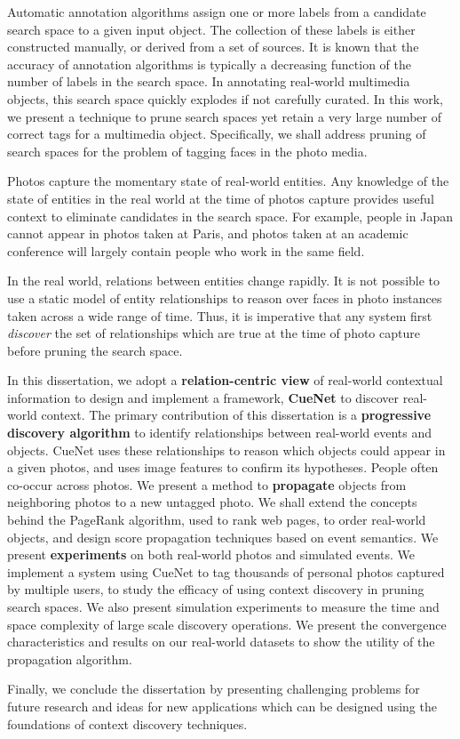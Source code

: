 \thesisabstract
{
Automatic annotation algorithms assign one or more labels from a candidate search space to a given input object. The collection of these labels is either constructed manually, or derived from a set of sources. It is known that the accuracy of annotation algorithms is typically a decreasing function of the number of labels in the search space. In annotating real-world multimedia objects, this search space quickly explodes if not carefully curated. In this work, we present a technique to prune search spaces yet retain a very large number of correct tags for a multimedia object. Specifically, we shall address pruning of search spaces for the problem of tagging faces in the photo media.

Photos capture the momentary state of real-world entities. Any knowledge of the state of entities in the real world at the time of photos capture provides useful context to eliminate candidates in the search space. For example, people in Japan cannot appear in photos taken at Paris, and photos taken at an academic conference will largely contain people who work in the same field. 

In the real world, relations between entities change rapidly. It is not possible to use a static model of entity relationships to reason over faces in photo instances taken across a wide range of time. Thus, it is imperative that any system first \textit{discover} the set of relationships which are true at the time of photo capture before pruning the search space.

In this dissertation, we adopt a \textbf{relation-centric view} of real-world contextual information to design and implement a framework, \textbf{CueNet} to discover real-world context. The primary contribution of this dissertation is a \textbf{progressive discovery algorithm} to identify relationships between real-world events and objects. CueNet uses these relationships to reason which objects could appear in a given photos, and uses image features to confirm its hypotheses. People often co-occur across photos. We present a method to \textbf{propagate} objects from neighboring photos to a new untagged photo. We shall extend the concepts behind the PageRank algorithm, used to rank web pages, to order real-world objects, and design score propagation techniques based on event semantics. We present \textbf{experiments} on both real-world photos and simulated events. We implement a system using CueNet to tag thousands of personal photos captured by multiple users, to study the efficacy of using context discovery in pruning search spaces. We also present simulation experiments to measure the time and space complexity of large scale discovery operations. We present the convergence characteristics and results on our real-world datasets to show the utility of the propagation algorithm. 

Finally, we conclude the dissertation by presenting challenging problems for future research and ideas for new applications which can be designed using the foundations of context discovery techniques.
}


